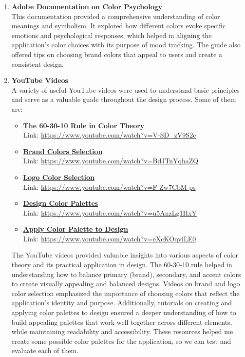\begin{enumerate}
    \item \textbf{Adobe Documentation on Color Psychology \cite{adobe-color}} \\
    This documentation provided a comprehensive understanding of color meanings and symbolism. It explored how different colors evoke specific emotions and psychological responses, which helped in aligning the application's color choices with its purpose of mood tracking. The guide also offered tips on choosing brand colors that appeal to users and create a consistent design.
    \vspace{5mm}
    \item \textbf{YouTube Videos} \\
    A variety of useful YouTube videos were used to understand basic principles and serve as a valuable guide throughout the design process. Some of them are:

    \begin{itemize}
        \item \textbf{\href{https://www.youtube.com/watch?v=V-SD_zV9S2c}{The 60-30-10 Rule in Color Theory}} \\
        Link: \url{https://www.youtube.com/watch?v=V-SD_zV9S2c}
        \item \textbf{\href{https://www.youtube.com/watch?v=BdJTnYqhaZQ}{Brand Colors Selection}} \\
        Link: \url{https://www.youtube.com/watch?v=BdJTnYqhaZQ}
        \item \textbf{\href{https://www.youtube.com/watch?v=F-Zw7CbM-ps}{Logo Color Selection}} \\
        Link: \url{https://www.youtube.com/watch?v=F-Zw7CbM-ps}
        \item \textbf{\href{https://www.youtube.com/watch?v=u5AnzLg1HxY}{Design Color Palettes}} \\
        Link: \url{https://www.youtube.com/watch?v=u5AnzLg1HxY}
        \item \textbf{\href{https://www.youtube.com/watch?v=eXcKOqviLE0}{Apply Color Palette to Design}} \\
        Link: \url{https://www.youtube.com/watch?v=eXcKOqviLE0}
    \end{itemize}    

    \noindent The YouTube videos provided valuable insights into various aspects of color theory and its practical application in design. The 60-30-10 rule helped in understanding how to balance primary (brand), secondary, and accent colors to create visually appealing and balanced designs. Videos on brand and logo color selection emphasized the importance of choosing colors that reflect the application's identity and purpose. Additionally, tutorials on creating and applying color palettes to design ensured a deeper understanding of how to build appealing palettes that work well together across different elements, while maintaining readability and accessibility. These resources helped me create some possible color palettes for the application, so we can test and evaluate each of them.
\end{enumerate}

